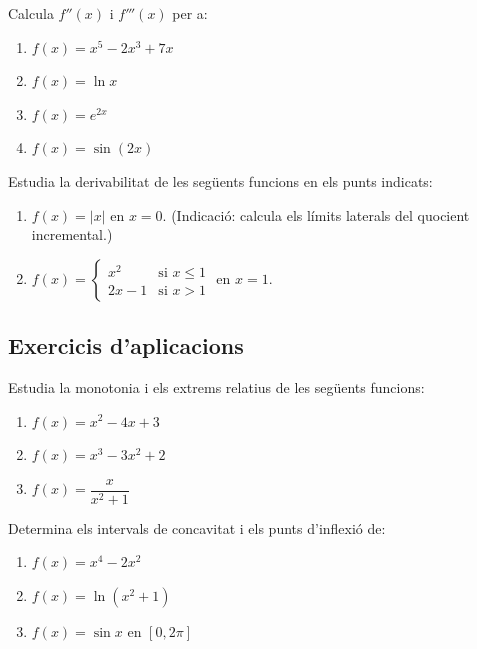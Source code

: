 \documentclass[12pt]{article}
\begin{document}
\begin{exercici}
Calcula $f''(x)$ i $f'''(x)$ per a:
\begin{enumerate}
    \item $f(x)=x^5-2x^3+7x$
    \item $f(x)=\ln x$
    \item $f(x)=e^{2x}$
    \item $f(x)=\sin(2x)$
\end{enumerate}
\end{exercici}

\begin{exercici}
Estudia la derivabilitat de les següents funcions en els punts indicats:
\begin{enumerate}
    \item $f(x)=|x|$ en $x=0$. (Indicació: calcula els límits laterals del quocient incremental.)
    \item $f(x)=
    \begin{cases}
    x^2 & \text{si } x\le 1 \\
    2x-1 & \text{si } x>1
    \end{cases}
    $ en $x=1$.
\end{enumerate}
\end{exercici}

\subsection{Exercicis d'aplicacions}

\begin{exercici}
Estudia la monotonia i els extrems relatius de les següents funcions:
\begin{enumerate}
    \item $f(x)=x^2-4x+3$
    \item $f(x)=x^3-3x^2+2$
    \item $f(x)=\dfrac{x}{x^2+1}$
\end{enumerate}
\end{exercici}

\begin{exercici}
Determina els intervals de concavitat i els punts d'inflexió de:
\begin{enumerate}
    \item $f(x)=x^4-2x^2$
    \item $f(x)=\ln(x^2+1)$
    \item $f(x)=\sin x$ en $[0,2\pi]$
\end{enumerate}
\end{exercici}
\end{document}
